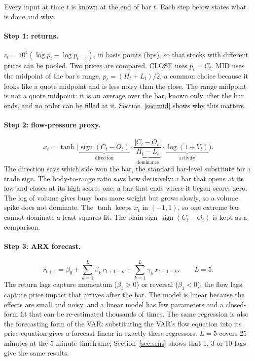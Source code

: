 \documentclass[11pt,a4paper]{article}
\begin{document}
Every input at time $t$ is known at the end of bar $t$. Each step below states what is done and why.

\paragraph{Step 1: returns.} $r_t = 10^4(\log p_t - \log p_{t-1})$, in basis points (bps), so that stocks
with different prices can be pooled. Two prices are compared. CLOSE uses $p_t=C_t$. MID uses the midpoint
of the bar's range, $p_t=(H_t+L_t)/2$, a common choice because it looks like a quote midpoint and is less
noisy than the close. The range midpoint is not a quote midpoint: it is an average over the bar, known only after the bar
ends, and no order can be filled at it. Section~\ref{sec:mid} shows why this matters.

\paragraph{Step 2: flow-pressure proxy.}
\begin{equation}
x_t = \tanh\!\Big(\underbrace{\operatorname{sign}(C_t-O_t)}_{\text{direction}}\cdot
\underbrace{\frac{|C_t-O_t|}{H_t-L_t}}_{\text{dominance}}\cdot\underbrace{\log(1+V_t)}_{\text{activity}}\Big).
\label{eq:x}
\end{equation}
The direction says which side won the bar, the standard bar-level substitute for a trade sign. The
body-to-range ratio says how decisively: a bar that opens at its low and closes at its high scores one,
a bar that ends where it began scores zero. The log of volume gives busy bars more weight but grows slowly,
so a volume spike does not dominate. The $\tanh$ keeps $x_t$ in $(-1,1)$, so one extreme bar cannot
dominate a least-squares fit. The plain sign $\operatorname{sign}(C_t-O_t)$ is kept as a comparison.

\paragraph{Step 3: ARX forecast.}
\begin{equation}
\hat r_{t+1} = \beta_0 + \sum_{k=1}^{L}\beta_k\, r_{t+1-k} + \sum_{k=1}^{L}\gamma_k\, x_{t+1-k},\qquad L=5.
\label{eq:arx}
\end{equation}
The return lags capture momentum ($\beta_1>0$) or reversal ($\beta_1<0$); the flow lags capture price
impact that arrives after the bar. The model is linear because the effects are small and noisy, and a
linear model has few parameters and a closed-form fit that can be re-estimated thousands of times. The same regression is also the forecasting form of the \citet{hasbrouck1991} VAR: substituting the VAR's flow
equation into its price equation gives a forecast linear in exactly these regressors. $L=5$ covers 25
minutes at the 5-minute timeframe; Section~\ref{sec:sens} shows that 1, 3 or 10 lags give the same
results.
\end{document}
